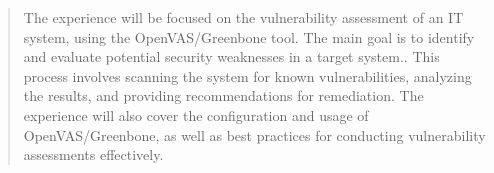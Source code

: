 \begin{abstract}
\label{chap:introduction}

The experience will be focused on the vulnerability assessment of an IT system, 
using the OpenVAS/Greenbone tool. 
The main goal is to identify and evaluate 
potential security weaknesses in a target system.. 
This process involves scanning the system for known 
vulnerabilities, analyzing the results, and providing recommendations for 
remediation. 
The experience will also cover the configuration and usage of 
OpenVAS/Greenbone, as well as best practices for conducting vulnerability 
assessments effectively.
\end{abstract}
